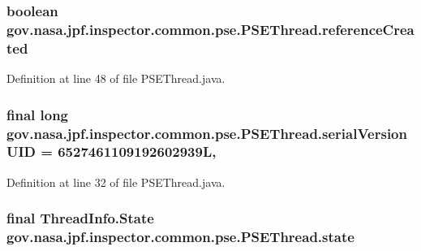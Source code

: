 \subsubsection[{\texorpdfstring{reference\+Created}{referenceCreated}}]{\setlength{\rightskip}{0pt plus 5cm}boolean gov.\+nasa.\+jpf.\+inspector.\+common.\+pse.\+P\+S\+E\+Thread.\+reference\+Created\hspace{0.3cm}{\ttfamily [private]}}\hypertarget{classgov_1_1nasa_1_1jpf_1_1inspector_1_1common_1_1pse_1_1_p_s_e_thread_a920fb66d370e5a3c025c689f3de5d017}{}\label{classgov_1_1nasa_1_1jpf_1_1inspector_1_1common_1_1pse_1_1_p_s_e_thread_a920fb66d370e5a3c025c689f3de5d017}


Definition at line 48 of file P\+S\+E\+Thread.\+java.

\subsubsection[{\texorpdfstring{serial\+Version\+U\+ID}{serialVersionUID}}]{\setlength{\rightskip}{0pt plus 5cm}final long gov.\+nasa.\+jpf.\+inspector.\+common.\+pse.\+P\+S\+E\+Thread.\+serial\+Version\+U\+ID = 6527461109192602939L\hspace{0.3cm}{\ttfamily [static]}, {\ttfamily [private]}}\hypertarget{classgov_1_1nasa_1_1jpf_1_1inspector_1_1common_1_1pse_1_1_p_s_e_thread_aba6cbfca644d3eeb73bb5bb30560ee21}{}\label{classgov_1_1nasa_1_1jpf_1_1inspector_1_1common_1_1pse_1_1_p_s_e_thread_aba6cbfca644d3eeb73bb5bb30560ee21}


Definition at line 32 of file P\+S\+E\+Thread.\+java.

\subsubsection[{\texorpdfstring{state}{state}}]{\setlength{\rightskip}{0pt plus 5cm}final Thread\+Info.\+State gov.\+nasa.\+jpf.\+inspector.\+common.\+pse.\+P\+S\+E\+Thread.\+state\hspace{0.3cm}{\ttfamily [private]}}\hypertarget{classgov_1_1nasa_1_1jpf_1_1inspector_1_1common_1_1pse_1_1_p_s_e_thread_a9972c3b2bc7a38873fe37e14a0e2af67}{}\label{classgov_1_1nasa_1_1jpf_1_1inspector_1_1common_1_1pse_1_1_p_s_e_thread_a9972c3b2bc7a38873fe37e14a0e2af67}


